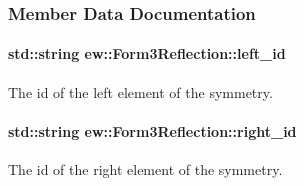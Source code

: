 \subsubsection{Member Data Documentation}
\hypertarget{classew_1_1Form3Reflection_a92f7f975175f01b8479fa8d40a6fba72}{
\paragraph[{left\_\-id}]{\setlength{\rightskip}{0pt plus 5cm}std::string {\bf ew::Form3Reflection::left\_\-id}}\hfill}
\label{classew_1_1Form3Reflection_a92f7f975175f01b8479fa8d40a6fba72}
The id of the left element of the symmetry. \hypertarget{classew_1_1Form3Reflection_a81b3c3658154ec37de3f00b9af60e468}{
\paragraph[{right\_\-id}]{\setlength{\rightskip}{0pt plus 5cm}std::string {\bf ew::Form3Reflection::right\_\-id}}\hfill}
\label{classew_1_1Form3Reflection_a81b3c3658154ec37de3f00b9af60e468}
The id of the right element of the symmetry. 